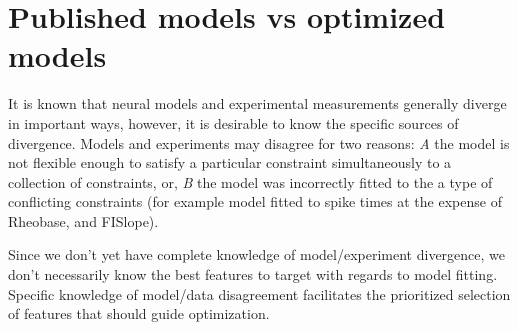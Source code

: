 

\section{Published models vs optimized models}
\label{sec:optimizing-published-models}
It is known that neural models and experimental measurements generally diverge in important ways, however, it is desirable to know the specific sources of divergence. Models and experiments may disagree for two reasons: \emph{A} the model is not flexible enough to satisfy a particular constraint simultaneously to a collection of constraints, or, \emph{B} the model was incorrectly fitted to the a type of conflicting constraints (for example model fitted to spike times at the expense of Rheobase, and FISlope). 

Since we don't yet have complete knowledge of model/experiment divergence, we don't necessarily know the best features to target with regards to model fitting. Specific knowledge of model/data disagreement facilitates the prioritized selection of features that should guide optimization. 






